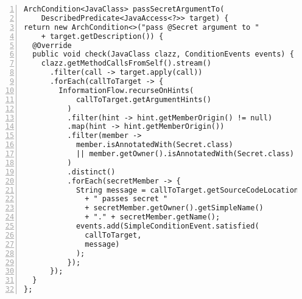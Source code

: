 \clearpage
\begin{lstlisting}[caption={Constraint 7: passSecretArgumentTo custom condition.}, captionpos=b, label=lst:constraint_7_condition, numbers=left, showstringspaces=false]
ArchCondition<JavaClass> passSecretArgumentTo(
    DescribedPredicate<JavaAccess<?>> target) {
return new ArchCondition<>("pass @Secret argument to "
    + target.getDescription()) {
  @Override
  public void check(JavaClass clazz, ConditionEvents events) {
    clazz.getMethodCallsFromSelf().stream()
      .filter(call -> target.apply(call))
      .forEach(callToTarget -> {
        InformationFlow.recurseOnHints(
            callToTarget.getArgumentHints()
          )
          .filter(hint -> hint.getMemberOrigin() != null)
          .map(hint -> hint.getMemberOrigin())
          .filter(member ->
            member.isAnnotatedWith(Secret.class)
            || member.getOwner().isAnnotatedWith(Secret.class)
          )
          .distinct()
          .forEach(secretMember -> {
            String message = callToTarget.getSourceCodeLocation()
              + " passes secret "
              + secretMember.getOwner().getSimpleName()
              + "." + secretMember.getName();
            events.add(SimpleConditionEvent.satisfied(
              callToTarget,
              message)
            );
          });
      });
  }
};
\end{lstlisting}

